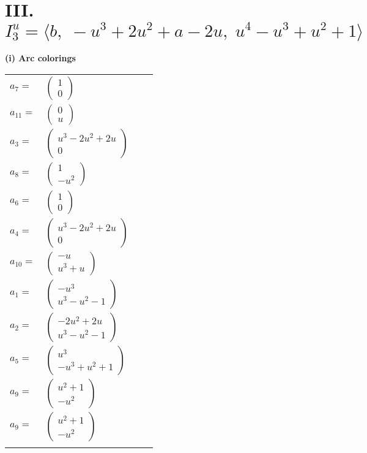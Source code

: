 \documentclass[1p]{elsarticle_modified}
\theoremstyle{definition}
\begin{document}
\centering \section*{III. $I^u_{3}= \langle b,\;- u^3+2 u^2+a-2 u,\;u^4- u^3+u^2+1 \rangle$}
\flushleft \textbf{(i) Arc colorings}\\
\begin{tabular}{m{7pt} m{180pt} m{7pt} m{180pt} }
\flushright $a_{7}=$&$\begin{pmatrix}1\\0\end{pmatrix}$ \\
\flushright $a_{11}=$&$\begin{pmatrix}0\\u\end{pmatrix}$ \\
\flushright $a_{3}=$&$\begin{pmatrix}u^3-2 u^2+2 u\\0\end{pmatrix}$ \\
\flushright $a_{8}=$&$\begin{pmatrix}1\\- u^2\end{pmatrix}$ \\
\flushright $a_{6}=$&$\begin{pmatrix}1\\0\end{pmatrix}$ \\
\flushright $a_{4}=$&$\begin{pmatrix}u^3-2 u^2+2 u\\0\end{pmatrix}$ \\
\flushright $a_{10}=$&$\begin{pmatrix}- u\\u^3+u\end{pmatrix}$ \\
\flushright $a_{1}=$&$\begin{pmatrix}- u^3\\u^3- u^2-1\end{pmatrix}$ \\
\flushright $a_{2}=$&$\begin{pmatrix}-2 u^2+2 u\\u^3- u^2-1\end{pmatrix}$ \\
\flushright $a_{5}=$&$\begin{pmatrix}u^3\\- u^3+u^2+1\end{pmatrix}$ \\
\flushright $a_{9}=$&$\begin{pmatrix}u^2+1\\- u^2\end{pmatrix}$\\ \flushright $a_{9}=$&$\begin{pmatrix}u^2+1\\- u^2\end{pmatrix}$\\&\end{tabular}
\end{document}

